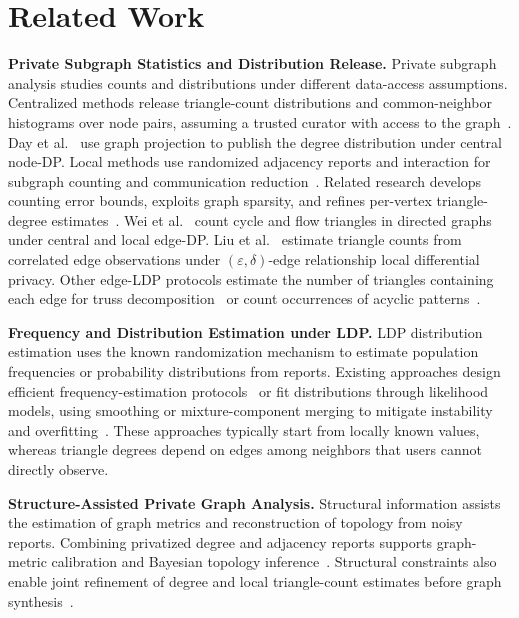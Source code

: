 \section{Related Work}
\noindent\textbf{Private Subgraph Statistics and Distribution Release.}
Private subgraph analysis studies counts and distributions under different data-access assumptions.
Centralized methods release triangle-count distributions and common-neighbor histograms over node pairs, assuming a trusted curator with access to the graph~\cite{dingDifferentiallyPrivateTriangle2022,lvPublishingTriangleCounting2021,lvPublishingCommonNeighbors2024a}.
Day et al.~\cite{day2016degree} use graph projection to publish the degree distribution under central node-DP.
Local methods use randomized adjacency reports and interaction for subgraph counting and communication reduction~\cite{imola2021locally,LDPGDDImola2022Corrected,guo2026tritr}.
Related research develops counting error bounds, exploits graph sparsity, and refines per-vertex triangle-degree estimates~\cite{LDPGDDEden2023,mundra2025practical,he2025robust}.
Wei et al.~\cite{wei2025directed} count cycle and flow triangles in directed graphs under central and local edge-DP.
Liu et al.~\cite{liu2024relationship} estimate triangle counts from correlated edge observations under $(\varepsilon,\delta)$-edge relationship local differential privacy.
Other edge-LDP protocols estimate the number of triangles containing each edge for truss decomposition~\cite{zhang2025truss} or count occurrences of acyclic patterns~\cite{hu2026acyclic}.

\noindent\textbf{Frequency and Distribution Estimation under LDP.}
LDP distribution estimation uses the known randomization mechanism to estimate population frequencies or probability distributions from reports.
Existing approaches design efficient frequency-estimation protocols~\cite{LDPGDDWang2017,bassily2015succinct} or fit distributions through likelihood models, using smoothing or mixture-component merging to mitigate instability and overfitting~\cite{li2020estimating,ye2025revisiting}.
These approaches typically start from locally known values, whereas triangle degrees depend on edges among neighbors that users cannot directly observe.

\noindent\textbf{Structure-Assisted Private Graph Analysis.}
Structural information assists the estimation of graph metrics and reconstruction of topology from noisy reports.
Combining privatized degree and adjacency reports supports graph-metric calibration and Bayesian topology inference~\cite{Ye2022,LDPGDDZhu2023Blink}.
Structural constraints also enable joint refinement of degree and local triangle-count estimates before graph synthesis~\cite{dong2026ldpgraph}.
